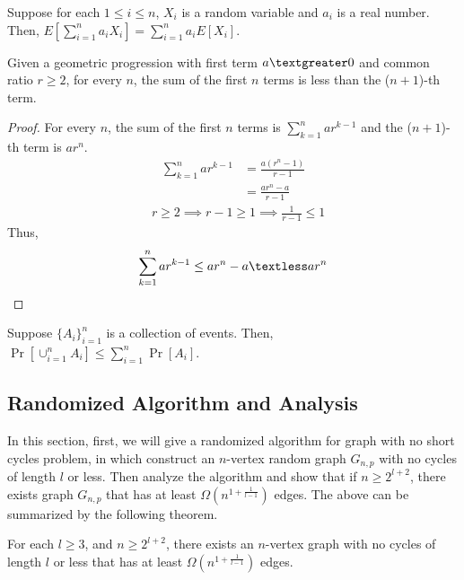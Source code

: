 \begin{lemma}\label{linearity}
Suppose for each $1 \le i \le n$, $X_i$ is a random variable and $a_i$ is a real number. Then, $E[\sum_{i=1}^na_iX_i]=\sum_{i=1}^{n}a_iE[X_i]$.
\end{lemma}
\begin{lemma}\label{gp}
Given a geometric progression with first term $a \textgreater 0$ and common ratio $r \ge 2$, for every $n$, the sum of the first $n$ terms is less than the ($n+1$)-th term.
\end{lemma}
\begin{proof}
For every $n$, the sum of the first $n$ terms is $\sum_{k=1}^{n}ar^{k-1}$ and the ($n+1$)-th term is $ar^{n}$.
\begin{align}
    \nonumber \sum_{k=1}^{n}ar^{k-1}&=\frac{a(r^{n}-1)}{r-1}\\
    \nonumber &=\frac{ar^{n}-a}{r-1}
\end{align}
\begin{align}
    \nonumber &r\ge 2 \implies r-1 \ge 1 \implies \frac{1}{r-1} \le 1
\end{align}
Thus, 
\begin{align}
    \nonumber \sum_{k=1}^{n}ar^{k-1}\le ar^{n}-a \textless ar^{n}
\end{align} 
\end{proof}
\begin{lemma}\label{union}
Suppose $\{A_i\}_{i=1}^n$ is a collection of events. Then, $\Pr[\cup_{i=1}^{n}A_i]\le\sum_{i=1}^{n}\Pr[A_i]$.
\end{lemma}
\subsection {Randomized Algorithm and Analysis}\label{RA}
In this section, first, we will give a randomized algorithm for graph with no short cycles problem, in which construct an $n$-vertex random graph $G_{n,p}$ with no cycles of length $l$ or less. Then analyze the algorithm and show that if $n\ge 2^{l+2}$, there exists graph $G_{n,p}$ that has at least $\Omega (n^{1+\frac{1}{l-1}})$ edges. The above can be summarized by the following theorem.
\begin{theorem}
For each $l\ge 3$, and $n\ge 2^{l+2}$, there exists an $n$-vertex graph with no cycles of length $l$ or less that has at least $\Omega (n^{1+\frac{1}{l-1}})$ edges.
\end{theorem}
